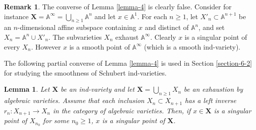 \documentclass[12pt]{amsart}
\newtheorem{lemma}{Lemma}
\theoremstyle{definition}
\newtheorem{remark}{Remark}
\begin{document}
\begin{remark}
\label{remark-1}
The converse of Lemma \ref{lemma-4} is clearly false. Consider for
instance $\mathbf{X}=\mathbb{A}^\infty=\bigcup_{n\geq 1}\mathbb{A}^n$ and let $x\in\mathbb{A}^1$. For each $n\geq 1$, let $X'_n\subset\mathbb{A}^{n+1}$ be an $n$-dimensional affine subspace containing $x$ and distinct of $\mathbb{A}^n$, and set $X_n=\mathbb{A}^n\cup X'_n$. The subvarieties $X_n$ exhaust $\mathbb{A}^\infty$.
Clearly $x$ is a singular point of every $X_n$. However
$x$ is a smooth point of $\mathbb{A}^\infty$ (which is a smooth ind-variety).
\end{remark}

The following partial converse of Lemma \ref{lemma-4} is used in Section \ref{section-6-2} for studying the smoothness of Schubert ind-varieties.

\begin{lemma}
\label{lemma-2} Let $\mathbf{X}$ be an ind-variety and let $\mathbf{X}=\bigcup_{n\geq 1}X_n$ be an exhaustion by algebraic varieties. Assume that each inclusion $X_n\subset X_{n+1}$ has a
left inverse $r_n:X_{n+1}\to X_n$ in the category of algebraic varieties. Then, if $x\in \mathbf{X}$ is a singular point of $X_{n_0}$ for
some $n_0\geq 1$, $x$ is a singular point of $\mathbf{X}$.
\end{lemma}
\end{document}
